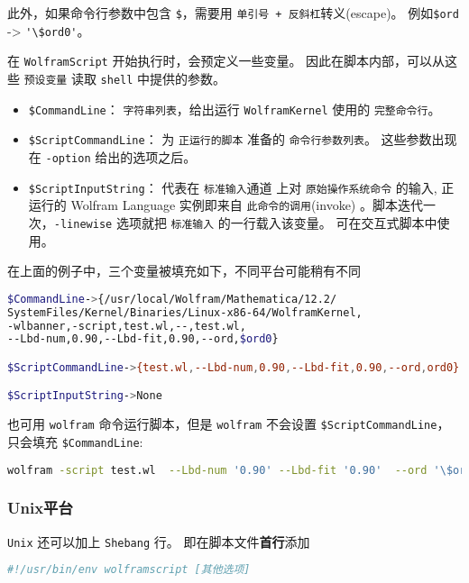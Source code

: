 此外，如果命令行参数中包含 \verb`$`，需要用 \verb`单引号 + 反斜杠`转义(escape)。
例如\verb`$ord` -> \verb`'\$ord0'`。

在 \verb`WolframScript` 开始执行时，会预定义一些变量。
因此在脚本内部，可以从这些 \verb`预设变量` 读取 \verb`shell` 中提供的参数。

\begin{itemize}
\item \verb`$CommandLine`： \verb`字符串列表`，给出运行 \verb`WolframKernel` 使用的 \verb`完整命令行`。
\item \verb`$ScriptCommandLine`： 为 \verb`正运行的脚本` 准备的 \verb`命令行参数列表`。
这些参数出现在 \verb`-option` 给出的选项之后。
\item \verb`$ScriptInputString`： 代表在 \verb`标准输入`通道 上对 \verb`原始操作系统命令` 的输入,
正运行的 Wolfram Language 实例即来自 \verb`此命令的调用`(invoke)
。脚本迭代一次，\verb`-linewise` 选项就把 \verb`标准输入` 的一行载入该变量。
可在交互式脚本中使用。
\end{itemize}


在上面的例子中，三个变量被填充如下，不同平台可能稍有不同

\begin{lstlisting}[language=bash]
$CommandLine->{/usr/local/Wolfram/Mathematica/12.2/
SystemFiles/Kernel/Binaries/Linux-x86-64/WolframKernel,
-wlbanner,-script,test.wl,--,test.wl,
--Lbd-num,0.90,--Lbd-fit,0.90,--ord,$ord0}

$ScriptCommandLine->{test.wl,--Lbd-num,0.90,--Lbd-fit,0.90,--ord,ord0}

$ScriptInputString->None
\end{lstlisting}

也可用 \verb`wolfram` 命令运行脚本，但是 \verb`wolfram` 不会设置 \verb`$ScriptCommandLine`，只会填充 \verb`$CommandLine`:

\begin{lstlisting}[language=bash]
wolfram -script test.wl  --Lbd-num '0.90' --Lbd-fit '0.90'  --ord '\$ord0'
\end{lstlisting}

\subsubsection{Unix平台} 

\verb`Unix` 还可以加上 \verb`Shebang` 行。 即在脚本文件\textbf{首行}添加
\begin{lstlisting}[language=bash]
#!/usr/bin/env wolframscript [其他选项]
\end{lstlisting}

